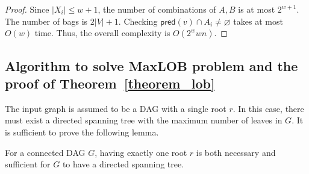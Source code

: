 \documentclass[runningheads]{llncs}
\theoremstyle{plain}
\theoremstyle{definition}
\begin{document}
\begin{proof}
    Since $|X_i| \leq w+1$, the number of combinations of $A, B$ is at most $2^{w+1}$. The number of bags is $2|V|+1$. Checking $\mathsf{pred}(v) \cap A_i \neq \varnothing$ takes at most $O(w)$ time. Thus, the overall complexity is $O(2^w w n)$.
\end{proof}








\subsection{Algorithm to solve MaxLOB problem and the proof of \textbf{Theorem~\ref{theorem_lob}}}

The input graph is assumed to be a DAG with a single root $r$. In this case, there must exist a directed spanning tree with the maximum number of leaves in $G$. It is sufficient to prove the following lemma.

\begin{lemma}\label{lemma_spanning}
    For a connected DAG $G$, having exactly one root $r$ is both necessary and sufficient for $G$ to have a directed spanning tree.
\end{lemma}
\end{document}
